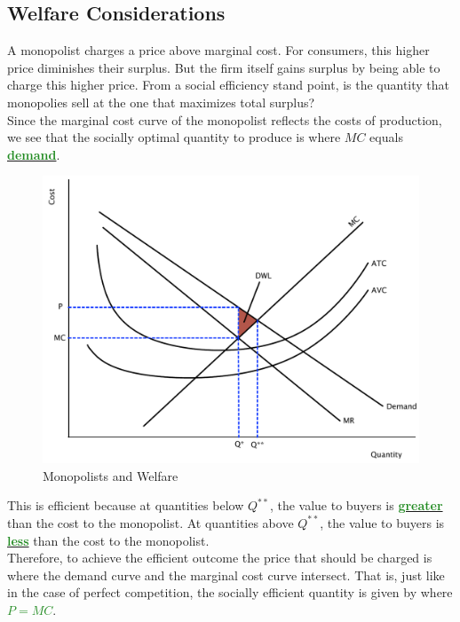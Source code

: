 \documentclass[11pt]{article}\usepackage[]{graphicx}\usepackage[]{color}
\theoremstyle{definition}
\newcommand{\dd}[1]{{\underline{\textbf{\textcolor{ForestGreen}{#1}}}}}
\begin{document}
	\subsection{Welfare Considerations}
	
	A monopolist charges a price above marginal cost. For consumers, this higher price diminishes their surplus. But the firm itself gains surplus by being able to charge this higher price. From a social efficiency stand point, is the quantity that monopolies sell at the one that maximizes total surplus?
	\\
	
	Since the marginal cost curve of the monopolist reflects the costs of production, we see that the socially optimal quantity to produce is where $MC$ equals \dd{demand}.
	
		\begin{figure}[H]
			\centering
			\includegraphics[scale=.40]{plot76.pdf}
			\caption{Monopolists and Welfare}
		\end{figure}
	
	This is efficient because at quantities below $Q^{**}$, the value to buyers is \dd{greater} than the cost to the monopolist. At quantities above $Q^{**}$, the value to buyers is \dd{less} than the cost to the monopolist.
	\\
	
	Therefore, to achieve the efficient outcome the price that should be charged is where the demand curve and the marginal cost curve intersect. That is, just like in the case of perfect competition, the socially efficient quantity is given by where \dd{$P = MC$}. 
	\\
	
\end{document}
